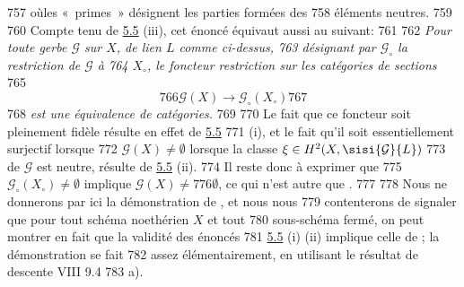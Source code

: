    757	où\pageoriginale les « primes »  désignent les parties formées des
   758	éléments neutres.
   759	
   760	Compte tenu de \hyperref[XII.cor5.5]{5.5} (iii), cet énoncé équivaut aussi au suivant:
   761	
   762	\emph{Pour toute gerbe $\mathcal{G}$ sur $X$, de lien $L$ comme ci-dessus,
   763	  désignant par $\mathcal{G}_{\circ}$ la restriction de $\mathcal{G}$ à
   764	  $X_{\circ}$, le foncteur restriction sur les catégories de sections}
   765	$$
   766	\mathcal{G}(X)\longrightarrow \mathcal{G}_{\circ}(X_{\circ})
   767	$$
   768	\emph{est une équivalence de catégories.}
   769	
   770	Le fait que ce foncteur soit pleinement fidèle résulte en effet de \hyperref[XII.cor5.5]{5.5}
   771	(i), et le fait qu'il soit essentiellement surjectif lorsque
   772	$\mathcal{G}(X)\neq ∅$ \ie lorsque la classe $\xi \in H^2(X,\sisi{\mathcal{G}}{L})$
   773	de $\mathcal{G}$ est neutre, résulte de \hyperref[XII.cor5.5]{5.5} (ii). 
   774	Il reste donc à exprimer que 
   775	$\mathcal{G}_{\circ}(X_{\circ})\neq ∅$ implique $\mathcal{G}(X)\neq
   776	∅$, ce  qui n'est autre que .
   777	
   778	Nous ne donnerons par ici la démonstration de , et nous nous
   779	contenterons de signaler que pour tout schéma noethérien $X$ et tout
   780	sous-schéma fermé, on peut montrer en fait que la validité des énoncés
   781	\hyperref[XII.cor5.5]{5.5} (i) (ii) implique celle de ; la démonstration se fait
   782	assez élémentairement, en utilisant le résultat de descente VIII 9.4
   783	a).
